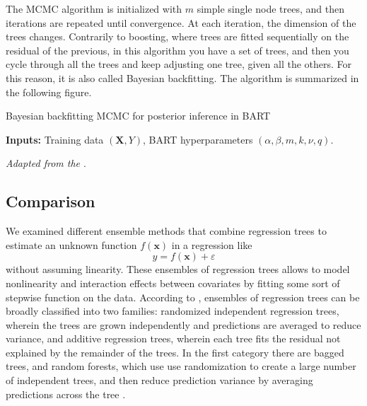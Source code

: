 \documentclass[a4paper,11pt]{article}
\begin{document}
The MCMC algorithm is initialized with $m$ simple single node trees, and then iterations are
 repeated until convergence. At each iteration, the dimension of the trees changes. Contrarily to boosting, where trees are fitted sequentially on the residual of the previous, in this algorithm you have a set of trees, and then you cycle through all the trees and keep adjusting one tree, given all the others. For this reason, it is also called Bayesian backfitting. 
The algorithm is summarized in the following figure.
\begin{algorithm} [h]
  \caption{Bayesian backfitting MCMC for posterior inference in BART}
  \label{MCMC}
  \SetAlgoLined
  \DontPrintSemicolon
  
  \textbf{Inputs:} Training data $(\mathbf{X}, Y)$, BART hyperparameters $(\alpha, \beta, m, k, \nu, q)$.\;
  
  
\end{algorithm}
\textit{Adapted from the \cite{ParticleGibbs}}.

\subsection{Comparison}
\label{Comparison}

We examined different ensemble methods that combine regression trees to estimate an unknown function $f(\mathbf{x})$ in a regression like 
\[
y = f(\mathbf{x}) + \varepsilon
\]
without assuming linearity.
These ensembles of regression trees allows to model nonlinearity and interaction effects between covariates by fitting some sort of stepwise function on the data. According to \cite{ParticleGibbs}, ensembles of regression trees can be
broadly classified into two families: randomized independent regression trees, wherein the trees are grown independently and predictions are averaged to reduce variance, and additive regression trees, wherein each
tree fits the residual not explained by the remainder of
the trees. In the first category there are bagged trees, and random forests, which use use randomization to create a large number of independent trees, and then reduce prediction variance by averaging predictions across the tree \parencite{chipmanBARTBayesianAdditive2010}.
\end{document}
